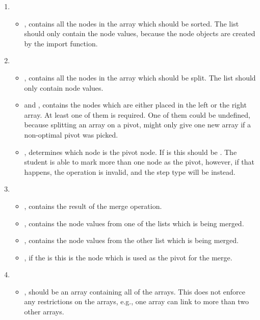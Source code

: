 \begin{enumerate}
    \item {}
    \begin{itemize}
        \item {}, contains all the nodes in the array which should be sorted. The list should only contain the node values, because the node objects are created by the import function.
    \end{itemize}
    \item {}
    \begin{itemize}
        \item {}, contains all the nodes in the array which should be split. The list should only contain node values.
        \item {} and , contains the nodes which are either placed in the left or the right array. At least one of them is required. One of them could be undefined, because splitting an array on a pivot, might only give one new array if a non-optimal pivot was picked.
        \item {}, determines which node is the pivot node. If  is  this should be . The student is able to mark more than one node as the pivot, however, if that happens, the operation is invalid, and the step type will be  instead.
    \end{itemize}
    \item {}
    \begin{itemize}
        \item {}, contains the result of the merge operation. 
        \item {}, contains the node values from one of the lists which is being merged.
        \item {}, contains the node values from the other list which is being merged.
        \item {}, if the  is  this is the node which is used as the pivot for the merge. 
    \end{itemize}
    \item {}
    \begin{itemize}
        \item {}, should be an array containing all of the arrays. This does not enforce any restrictions on the arrays, e.g., one array can link to more than two other arrays.
    \end{itemize}
\end{enumerate}